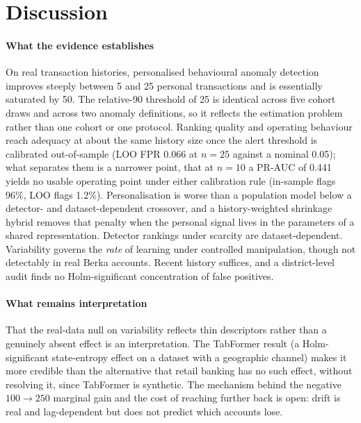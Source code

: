 \section{Discussion}\label{sec:discussion}

\paragraph{What the evidence establishes}
On real transaction histories, personalised behavioural anomaly detection improves steeply between 5 and 25 personal transactions and is essentially saturated by 50. The relative-90 threshold of 25 is identical across five cohort draws and across two anomaly definitions, so it reflects the estimation problem rather than one cohort or one protocol. Ranking quality and operating behaviour reach adequacy at about the same history size once the alert threshold is calibrated out-of-sample (LOO FPR 0.066 at $n=25$ against a nominal 0.05); what separates them is a narrower point, that at $n=10$ a PR-AUC of 0.441 yields no usable operating point under either calibration rule (in-sample flags 96\%, LOO flags 1.2\%). Personalisation is worse than a population model below a detector- and dataset-dependent crossover, and a history-weighted shrinkage hybrid removes that penalty when the personal signal lives in the parameters of a shared representation. Detector rankings under scarcity are dataset-dependent. Variability governs the \emph{rate} of learning under controlled manipulation, though not detectably in real Berka accounts. Recent history suffices, and a district-level audit finds no Holm-significant concentration of false positives.

\paragraph{What remains interpretation}
That the real-data null on variability reflects thin descriptors rather than a genuinely absent effect is an interpretation. The TabFormer result (a Holm-significant state-entropy effect on a dataset with a geographic channel) makes it more credible than the alternative that retail banking has no such effect, without resolving it, since TabFormer is synthetic. The mechanism behind the negative $100\to250$ marginal gain and the cost of reaching further back is open: drift is real and lag-dependent but does not predict which accounts lose.

